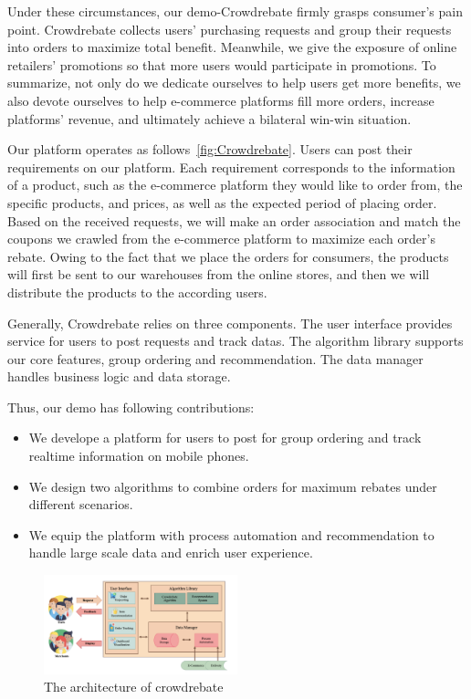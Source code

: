 Under these circumstances, our demo-Crowdrebate firmly grasps consumer's pain point. Crowdrebate collects users’
purchasing requests and group their requests into orders to
maximize total benefit. Meanwhile, we give the exposure of online retailers' promotions so that more users would participate in promotions. To summarize, not only do we dedicate ourselves to help users get more benefits, we also devote ourselves to help e-commerce platforms fill more orders, increase platforms’ revenue, and ultimately achieve a bilateral win-win situation.

Our platform operates as follows~\ref{fig:Crowdrebate}. Users can post their requirements on our platform. Each requirement corresponds to the information of a product, such as the e-commerce platform they would like to order from, the specific products, and prices, as well as the expected period of placing order. Based on the received requests, we will make an order association and match the coupons we crawled from the e-commerce platform to maximize each order's rebate. Owing to the fact that we place the orders for consumers, the products will first be sent to our warehouses from the online stores, and then we will distribute the products to the according users.

Generally, Crowdrebate relies on three components. The user interface provides service for users to post requests and track datas. The algorithm library supports our core features, group ordering and recommendation. The data manager handles business logic and data storage.

Thus, our demo has following contributions:
\begin{itemize}
	\item We develope a platform for users to post for group ordering and track realtime information on mobile phones.
	\item We design two algorithms to combine orders for maximum rebates under different scenarios.
	\item We equip the platform with process automation and recommendation to handle large scale data and enrich user experience.
\end{itemize}
\begin{figure}[t] 
	\centering %
	\includegraphics[width=0.5\textwidth]{../figure/ar.png} %
	\caption{The architecture of crowdrebate} %
	\label{fig:ar} %
\end{figure}

